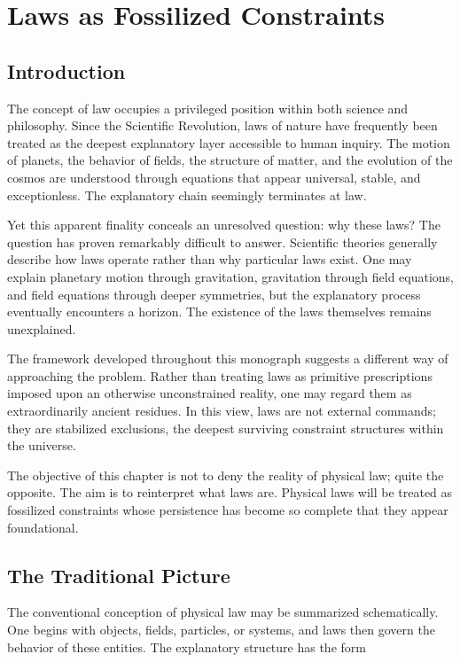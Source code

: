 \documentclass[11pt,oneside]{book}
\theoremstyle{plain}
\theoremstyle{definition}
\theoremstyle{remark}
\begin{document}
\chapter{Laws as Fossilized Constraints}

\section{Introduction}

The concept of law occupies a privileged position within both science and philosophy. Since the Scientific Revolution, laws of nature have frequently been treated as the deepest explanatory layer accessible to human inquiry. The motion of planets, the behavior of fields, the structure of matter, and the evolution of the cosmos are understood through equations that appear universal, stable, and exceptionless. The explanatory chain seemingly terminates at law.

Yet this apparent finality conceals an unresolved question: why these laws? The question has proven remarkably difficult to answer. Scientific theories generally describe how laws operate rather than why particular laws exist. One may explain planetary motion through gravitation, gravitation through field equations, and field equations through deeper symmetries, but the explanatory process eventually encounters a horizon. The existence of the laws themselves remains unexplained.

The framework developed throughout this monograph suggests a different way of approaching the problem. Rather than treating laws as primitive prescriptions imposed upon an otherwise unconstrained reality, one may regard them as extraordinarily ancient residues. In this view, laws are not external commands; they are stabilized exclusions, the deepest surviving constraint structures within the universe.

The objective of this chapter is not to deny the reality of physical law; quite the opposite. The aim is to reinterpret what laws are. Physical laws will be treated as fossilized constraints whose persistence has become so complete that they appear foundational.

\section{The Traditional Picture}

The conventional conception of physical law may be summarized schematically. One begins with objects, fields, particles, or systems, and laws then govern the behavior of these entities. The explanatory structure has the form
\end{document}
